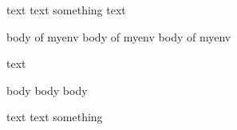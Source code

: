 text text
\if
	something \fi text
\begin{myenv}
	body of myenv
	body of myenv
	body of myenv
\end{myenv}

text

\begin{anotherenv}
	body
	body
	body
\end{anotherenv}

text text
\if
	something \fi